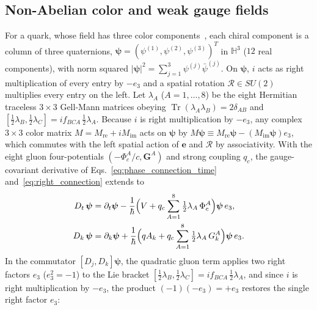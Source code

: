 \documentclass[aps,prd,onecolumn,tightenlines,nofootinbib,notitlepage,11pt,floatfix]{revtex4-2}
\theoremstyle{indentedtheorem}
\begin{document}
\subsection{Non-Abelian color and weak gauge fields}
\label{sec:color}

For a quark, whose field has three color components~\citep{FritzschGellMannLeutwyler1973Advantages,Peskin1995Introduction}, each chiral component is a column of three quaternions, $\boldsymbol{\psi} = (\psi^{(1)},\psi^{(2)},\psi^{(3)})^T$ in $\mathbb{H}^3$ ($12$ real components), with norm squared $|\boldsymbol{\psi}|^2 = \sum_{j=1}^3 \psi^{(j)}\bar{\psi}^{(j)}$. On $\boldsymbol{\psi}$, $i$ acts as right multiplication of every entry by $-e_3$ and a spatial rotation $\mathcal{R}\in SU(2)$ multiplies every entry on the left. Let $\lambda_A$ ($A=1,\dots,8$) be the eight Hermitian traceless $3\times 3$ Gell-Mann matrices obeying $\operatorname{Tr}(\lambda_A\lambda_B)=2\delta_{AB}$ and $[\tfrac{1}{2}\lambda_B,\tfrac{1}{2}\lambda_C] = i f_{BCA}\,\tfrac{1}{2}\lambda_A$. Because $i$ is right multiplication by $-e_3$, any complex $3\times 3$ color matrix $M = M_\text{re} + i M_\text{im}$ acts on $\boldsymbol{\psi}$ by $M\boldsymbol{\psi} \equiv M_\text{re}\boldsymbol{\psi} - (M_\text{im}\boldsymbol{\psi})e_3$, which commutes with the left spatial action of $\mathbf{e}$ and $\mathcal{R}$ by associativity. With the eight gluon four-potentials $(-\Phi_c^A/c,\mathbf{G}^A)$ and strong coupling $q_c$, the gauge-covariant derivative of Eqs.~\eqref{eq:phase_connection_time} and~\eqref{eq:right_connection} extends to
\begin{align}
    D_t\,\boldsymbol{\psi} &= \partial_t\boldsymbol{\psi} - \frac{1}{\hbar}\Big(V + q_c\sum_{A=1}^8\tfrac{1}{2}\lambda_A\,\Phi_c^A\Big)\boldsymbol{\psi}\,e_3 , \notag\\
    D_k\,\boldsymbol{\psi} &= \partial_k\boldsymbol{\psi} + \frac{1}{\hbar}\Big(qA_k + q_c\sum_{A=1}^8\tfrac{1}{2}\lambda_A\,G_k^A\Big)\boldsymbol{\psi}\,e_3 .
    \label{eq:color_covariant}
\end{align}
In the commutator $[D_j,D_k]\boldsymbol{\psi}$, the quadratic gluon term applies two right factors $e_3$ ($e_3^2=-1$) to the Lie bracket $[\tfrac{1}{2}\lambda_B,\tfrac{1}{2}\lambda_C] = i f_{BCA}\,\tfrac{1}{2}\lambda_A$, and since $i$ is right multiplication by $-e_3$, the product $(-1)(-e_3) = +e_3$ restores the single right factor $e_3$:
\end{document}
